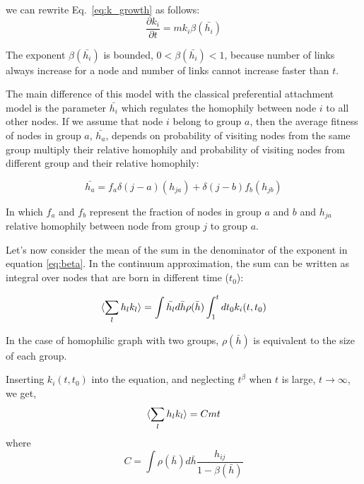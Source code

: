 
we can rewrite Eq.~\ref{eq:k_growth} as follows:
\begin{equation}
\label{eq:k_growth2}
\frac{\partial k_i}{\partial t} = m k_i \beta(\bar{h_{i}})
\end{equation}

The exponent $\beta(\bar{h_{i}})$ is bounded, $0< \beta(\bar{h_{i}})< 1$, because number of links always increase for a node and number of links cannot increase faster than $t$. 

The main difference of this model with the classical preferential attachment model is the parameter $\bar{h_{i}}$ which regulates the homophily between node $i$ to all other nodes. If we assume that node $i$ belong to group $a$, then the average fitness of nodes in group $a$, $\bar{h_{a}}$, depends on probability of visiting nodes from the same group multiply their relative homophily and probability of visiting nodes from different group and their relative homophily:

\begin{equation}
\label{eq:fitness_group}
    \bar{h_{a}} = f_{a} \delta(j-a) (h_{ja}) + \delta(j-b)  f_{b} (h_{jb})
\end{equation}


In which $f_{a}$ and $f_{b}$ represent the fraction of nodes in group $a$ and $b$ and $h_{ja}$ relative homophily between node from group $j$ to group $a$.



Let's now consider the mean of the sum in the denominator of the exponent in equation \ref{eq:beta}. In the continuum approximation, the sum can be written as integral over nodes that are born in different time ($t_{0}$):

\begin{equation}
   \operatorname{}\langle\sum_{l} h_{l} k_l\rangle = \int \bar{h_{l}} d\bar{h} \rho(\bar{h}) \int_{1}^{t} dt_{0} k_i(t,t_{0}) 
\end{equation}

In the case of homophilic graph with two groups, $\rho(\bar{h})$ is equivalent to the size of each group.


Inserting $k_i(t,t_{0})$  into the equation, and neglecting $t^{\beta}$ when $t$ is large, $t \to \infty$, we get,
\begin{equation}
   \operatorname{}\langle\sum_{l} h_{l} k_l\rangle = C m t
\end{equation}
where 
\begin{equation}
\label{eq:c}
   C = \int \rho(\bar{h}) d\bar{h} \frac{h_{ij}}{1-\beta(\bar{h})}
\end{equation}

